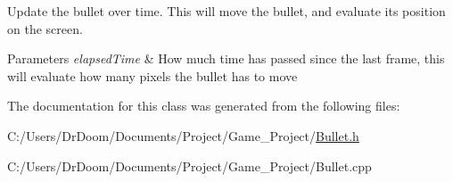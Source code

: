Update the bullet over time. This will move the bullet, and evaluate its position on the screen. 


\begin{DoxyParams}{Parameters}
{\em elapsed\+Time} & How much time has passed since the last frame, this will evaluate how many pixels the bullet has to move \\
\hline
\end{DoxyParams}


The documentation for this class was generated from the following files\+:\begin{DoxyCompactItemize}
\item 
C\+:/\+Users/\+Dr\+Doom/\+Documents/\+Project/\+Game\+\_\+\+Project/\hyperlink{_bullet_8h}{Bullet.\+h}\item 
C\+:/\+Users/\+Dr\+Doom/\+Documents/\+Project/\+Game\+\_\+\+Project/Bullet.\+cpp\end{DoxyCompactItemize}
